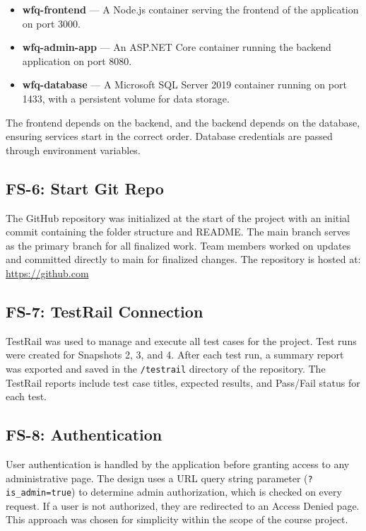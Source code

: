 \documentclass[12pt]{article}
\begin{document}
\begin{itemize}
    \item \textbf{wfq-frontend} --- A Node.js container serving the frontend of the
    application on port 3000.
    \item \textbf{wfq-admin-app} --- An ASP.NET Core container running the backend
    application on port 8080.
    \item \textbf{wfq-database} --- A Microsoft SQL Server 2019 container running on
    port 1433, with a persistent volume for data storage.
\end{itemize}
 
The frontend depends on the backend, and the backend depends on the database, ensuring
services start in the correct order. Database credentials are passed through environment
variables.
 
\subsection{FS-6: Start Git Repo}
The GitHub repository was initialized at the start of the project with an initial commit
containing the folder structure and README. The main branch serves as the primary branch
for all finalized work. Team members worked on updates and committed directly to main for
finalized changes. The repository is hosted at:
\url{https://github.com}
 
\subsection{FS-7: TestRail Connection}
TestRail was used to manage and execute all test cases for the project. Test runs were
created for Snapshots 2, 3, and 4. After each test run, a summary report was exported and
saved in the \texttt{/testrail} directory of the repository. The TestRail reports include
test case titles, expected results, and Pass/Fail status for each test.
 
\subsection{FS-8: Authentication}
User authentication is handled by the application before granting access to any
administrative page. The design uses a URL query string parameter
(\texttt{?is\_admin=true}) to determine admin authorization, which is checked on every
request. If a user is not authorized, they are redirected to an Access Denied page. This
approach was chosen for simplicity within the scope of the course project.
 
\end{document}
